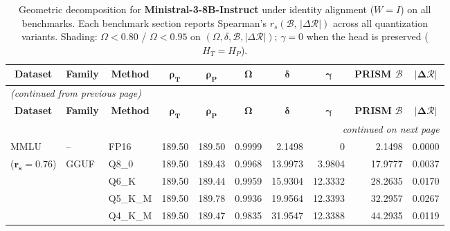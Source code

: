 \begingroup
\small
\setlength{\tabcolsep}{4pt}
\renewcommand{\arraystretch}{1.05}
\setlength{\LTcapwidth}{\textwidth}
\begin{longtable}{ll l rrrrrrr}
\caption{Geometric decomposition for \textbf{Ministral-3-8B-Instruct} under identity alignment ($W{=}I$) on all benchmarks. Each benchmark section reports Spearman's $r_s(\mathcal{B},\,|\Delta\mathcal{R}|)$ across all quantization variants. Shading: \colorbox{red!35}{$\Omega{<}0.80$} / \colorbox{red!18}{$\Omega{<}0.95$} on $(\Omega,\delta,\mathcal{B},|\Delta\mathcal{R}|)$; \colorbox{cyan!12}{$\gamma{=}0$} when the head is preserved ($H_T{=}H_P$).}\label{tab:mistral_instruct_decomposition_all_bound}\\
\toprule
\multicolumn{1}{c}{\textbf{Dataset}} & \multicolumn{1}{c}{\textbf{Family}} & \multicolumn{1}{c}{\textbf{Method}} & \multicolumn{1}{c}{$\boldsymbol{\rho_T}$} & \multicolumn{1}{c}{$\boldsymbol{\rho_P}$} & \multicolumn{1}{c}{$\boldsymbol{\Omega}$} & \multicolumn{1}{c}{$\boldsymbol{\delta}$} & \multicolumn{1}{c}{$\boldsymbol{\gamma}$} & \multicolumn{1}{c}{\textbf{PRISM} $\boldsymbol{\mathcal{B}}$} & \multicolumn{1}{c}{$\boldsymbol{|\Delta\mathcal{R}|}$} \\
\midrule
\endfirsthead
\multicolumn{10}{l}{\small\itshape (continued from previous page)}\\
\toprule
\multicolumn{1}{c}{\textbf{Dataset}} & \multicolumn{1}{c}{\textbf{Family}} & \multicolumn{1}{c}{\textbf{Method}} & \multicolumn{1}{c}{$\boldsymbol{\rho_T}$} & \multicolumn{1}{c}{$\boldsymbol{\rho_P}$} & \multicolumn{1}{c}{$\boldsymbol{\Omega}$} & \multicolumn{1}{c}{$\boldsymbol{\delta}$} & \multicolumn{1}{c}{$\boldsymbol{\gamma}$} & \multicolumn{1}{c}{\textbf{PRISM} $\boldsymbol{\mathcal{B}}$} & \multicolumn{1}{c}{$\boldsymbol{|\Delta\mathcal{R}|}$} \\
\midrule
\endhead
\midrule
\multicolumn{10}{r}{\small\itshape continued on next page}\\
\endfoot
\bottomrule
\endlastfoot
MMLU & -- & FP16 & 189.50 & 189.50 & 0.9999 & 2.1498 & \cellcolor{cyan!12} $0$ & 2.1498 & 0.0000 \\
{\small ($\mathbf{r_s{=}0.76}$)} & GGUF & Q8\_0 & 189.50 & 189.43 & 0.9968 & 13.9973 & 3.9804 & 17.9777 & 0.0037 \\
 &  & Q6\_K & 189.50 & 189.44 & 0.9959 & 15.9304 & 12.3332 & 28.2635 & 0.0170 \\
 &  & Q5\_K\_M & 189.50 & 189.78 & 0.9936 & 19.9564 & 12.3393 & 32.2957 & 0.0267 \\
 &  & Q4\_K\_M & 189.50 & 189.47 & 0.9835 & 31.9547 & 12.3388 & 44.2935 & 0.0119 \\

\end{longtable}
